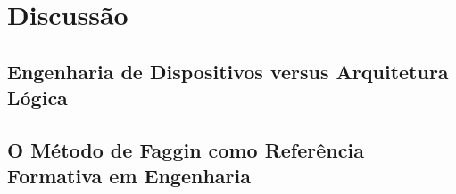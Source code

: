
\section{Discussão}
\label{sec:discussao}


\subsection{Engenharia de Dispositivos versus Arquitetura Lógica}
\label{subsec:dispositivos_vs_arquitetura}


\subsection{O Método de Faggin como Referência Formativa em Engenharia}
\label{subsec:metodo_formativo}


